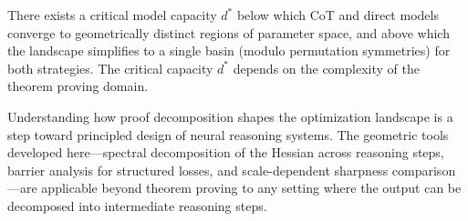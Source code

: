 \begin{conjecture}\label{conj:phase}
  There exists a critical model capacity $d^*$ below which CoT and direct
  models converge to geometrically distinct regions of parameter space, and
  above which the landscape simplifies to a single basin (modulo permutation
  symmetries) for both strategies. The critical capacity $d^*$ depends on the
  complexity of the theorem proving domain.
\end{conjecture}

Understanding how proof decomposition shapes the optimization landscape is a
step toward principled design of neural reasoning systems. The geometric tools
developed here---spectral decomposition of the Hessian across reasoning steps,
barrier analysis for structured losses, and scale-dependent sharpness
comparison---are applicable beyond theorem proving to any setting where the
output can be decomposed into intermediate reasoning steps.
